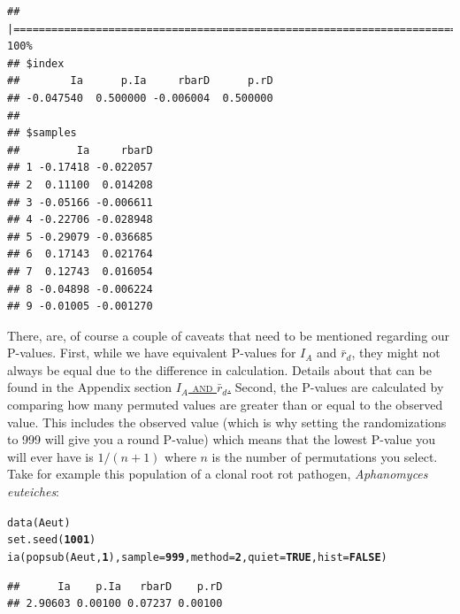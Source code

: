 \documentclass[letterpaper]{article}\usepackage[]{graphicx}\usepackage[]{color}
\makeatletter
\newcommand{\hlnum}[1]{\textcolor[rgb]{0.502,0,0.502}{\textbf{#1}}}%
\newcommand{\hlstd}[1]{\textcolor[rgb]{0,0,0}{#1}}%
\newcommand{\hlkwc}[1]{\textcolor[rgb]{0,0.502,0.753}{#1}}%
\newcommand{\hlkwd}[1]{\textcolor[rgb]{0,0.267,0.4}{#1}}%
\newenvironment{kframe}{%
 \def\at@end@of@kframe{}%
 \ifinner\ifhmode%
  \def\at@end@of@kframe{\end{minipage}}%
  \begin{minipage}{\columnwidth}%
 \fi\fi%
 \def\FrameCommand##1{\hskip\@totalleftmargin \hskip-\fboxsep
 \colorbox{shadecolor}{##1}\hskip-\fboxsep
     \hskip-\linewidth \hskip-\@totalleftmargin \hskip\columnwidth}%
 \MakeFramed {\advance\hsize-\width
   \@totalleftmargin\z@ \linewidth\hsize
   \@setminipage}}%
 {\par\unskip\endMakeFramed%
 \at@end@of@kframe}
\newenvironment{knitrout}{}{} %
\newcommand{\seclink}[2]{
  \textsc{\hyperref[#1]{#2}}
}
\makeatother
\begin{document}
\begin{knitrout}\footnotesize
{}\color{fgcolor}\begin{kframe}
\begin{verbatim}
## |================================================================================| 100%
## $index
##        Ia      p.Ia     rbarD      p.rD 
## -0.047540  0.500000 -0.006004  0.500000 
## 
## $samples
##         Ia     rbarD
## 1 -0.17418 -0.022057
## 2  0.11100  0.014208
## 3 -0.05166 -0.006611
## 4 -0.22706 -0.028948
## 5 -0.29079 -0.036685
## 6  0.17143  0.021764
## 7  0.12743  0.016054
## 8 -0.04898 -0.006224
## 9 -0.01005 -0.001270
\end{verbatim}
\end{kframe}
\end{knitrout}



There, are, of course a couple of caveats that need to be mentioned regarding our P-values. First, while we have equivalent P-values for $I_A$ and $\bar{r}_d$, they might not always be equal due to the difference in calculation. Details about that can be found in the Appendix section\seclink{appendix:algorithm:iard}{$I_A$ and $\bar{r}_d$.}Second, the P-values are calculated by comparing how many permuted values are greater than or equal to the observed value. This includes the observed value (which is why setting the randomizations to 999 will give you a round P-value) which means that the lowest P-value you will ever have is $1/(n+1)$ where $n$ is the number of permutations you select. Take for example this population of a clonal root rot pathogen, \textit{Aphanomyces euteiches}:
\begin{knitrout}\footnotesize
{}\color{fgcolor}\begin{kframe}
\begin{alltt}
\hlkwd{data}\hlstd{(Aeut)}
\hlkwd{set.seed}\hlstd{(}\hlnum{1001}\hlstd{)}
\hlkwd{ia}\hlstd{(}\hlkwd{popsub}\hlstd{(Aeut,} \hlnum{1}\hlstd{),} \hlkwc{sample} \hlstd{=} \hlnum{999}\hlstd{,} \hlkwc{method} \hlstd{=} \hlnum{2}\hlstd{,} \hlkwc{quiet} \hlstd{=} \hlnum{TRUE}\hlstd{,} \hlkwc{hist} \hlstd{=} \hlnum{FALSE}\hlstd{)}
\end{alltt}
\end{kframe}
\end{knitrout}

\begin{knitrout}\footnotesize
{}\color{fgcolor}\begin{kframe}
\begin{verbatim}
##      Ia    p.Ia   rbarD    p.rD 
## 2.90603 0.00100 0.07237 0.00100
\end{verbatim}
\end{kframe}
\end{knitrout}
\end{document}
